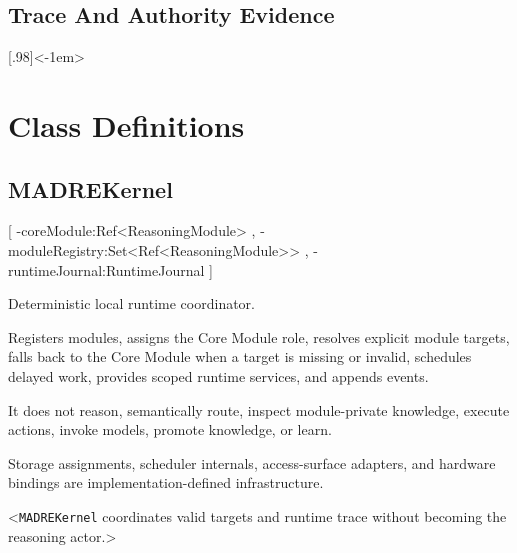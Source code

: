 \documentclass[11pt]{report}
\begin{document}
\subsection{Trace And Authority Evidence}
[.98\linewidth]<-1em>

\section{Class Definitions}

\subsection{MADREKernel}
[
	\UMLAt-coreModule:Ref<ReasoningModule> ,
	\UMLAt-moduleRegistry:Set<Ref<ReasoningModule>> ,
	\UMLAt-runtimeJournal:RuntimeJournal
]{%
	\item[] Deterministic local runtime coordinator.
	\item[] Registers modules, assigns the Core Module role, resolves explicit module targets, falls back to the Core Module when a target is missing or invalid, schedules delayed work, provides scoped runtime services, and appends events.
	\item[] It does not reason, semantically route, inspect module-private knowledge, execute actions, invoke models, promote knowledge, or learn.
	\item[] Storage assignments, scheduler internals, access-surface adapters, and hardware bindings are implementation-defined infrastructure.
}<\texttt{MADREKernel} coordinates valid targets and runtime trace without becoming the reasoning actor.>
\end{document}
